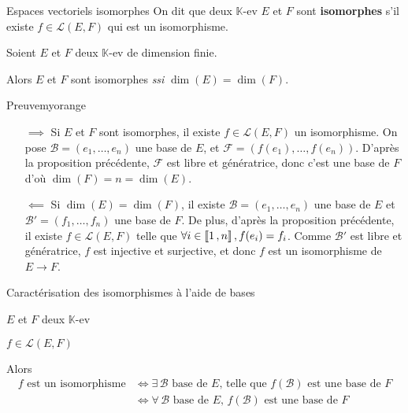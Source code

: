     \begin{defi}{Espaces vectoriels isomorphes}{}
        On dit que deux $\mathbb{K}$-ev $E$ et $F$ sont \textbf{isomorphes} s’il existe $f \in \mathcal{L}(E,F)$ qui est un isomorphisme.
    \end{defi}

    \begin{coro}{}{}
        Soient $E$ et $F$ deux $\mathbb{K}$-ev de dimension finie.

        Alors $E$ et $F$ sont isomorphes \textit{ssi} $\dim(E) = \dim(F)$.
    \end{coro}

    \begin{demo}{Preuve}{myorange}
        \begin{itemize}
            \item[\textcolor{myorange}{$\implies$}] Si $E$ et $F$ sont isomorphes, il existe $f \in \mathcal{L}(E,F)$ un isomorphisme. On pose $\mathcal{B} = (e_1,\ldots,e_n)$ une base de $E$, et $\mathcal{F} = (f(e_1),\ldots,f(e_n))$. D’après la proposition précédente, $\mathcal{F}$ est libre et génératrice, donc c’est une base de $F$ d’où $\dim(F) = n = \dim(E)$.
            \item[\textcolor{myorange}{$\impliedby$}] Si $\dim(E) = \dim(F)$, il existe $\mathcal{B} = (e_1,\ldots, e_n)$ une base de $E$ et $\mathcal{B}'=(f_1,\ldots,f_n)$ une base de $F$. De plus, d’après la proposition précédente, il existe $f \in \mathcal{L}(E,F)$ telle que $\forall i \in \left\llbracket 1 \, , n \right\rrbracket, f(e_i) = f_i$. Comme $\mathcal{B}'$ est libre et génératrice, $f$ est injective et surjective, et donc $f$ est un isomorphisme de $E \to F$.
        \end{itemize}
    \end{demo}

    \begin{theo}{Caractérisation des isomorphismes à l’aide de bases}{}
        \begin{soient}
            \item $E$ et $F$ deux $\mathbb{K}$-ev
            \item $f \in \mathcal{L}(E,F)$
        \end{soient}
        Alors \begin{align*}
            f \text{ est un isomorphisme} & \iff \exists \, \mathcal{B} \text{ base de } E \text{, telle que } f(\mathcal{B}) \text{ est une base de } F \\
            & \iff \forall \, \mathcal{B} \text{ base de } E, \, f(\mathcal{B}) \text{ est une base de } F
        \end{align*}
    \end{theo}
    
